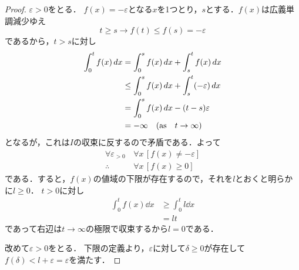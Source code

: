 \begin{enumerate}[(1)]
\begin{enumerate}[(i)]
\begin{proof}
            $\varepsilon > 0$をとる．
            $f(x)= -\varepsilon$となる$x$を1つとり，$s$とする．$f(x)$は広義単調減少ゆえ
            \begin{equation}
                t \ge s \to f(t)\le f(s) = -\varepsilon
            \end{equation}
            であるから，$t>s$に対し
            \begin{align}
                \int^t_0 f(x) \dd{x} 
                &= \int^s_0 f(x) \dd{x} + \int^t_s f(x) \dd{x} \\ 
                &\le \int^s_0 f(x) \dd{x} + \int^t_s (-\varepsilon)\dd{x} \\ 
                &= \int^s_0 f(x) \dd{x} -(t-s)\varepsilon \\ 
                &= -\infty\quad (\qq*{as} t\to \infty)
            \end{align}
            となるが，これは$I$の収束に反するので矛盾である．よって
            \begin{align}
                \forall \varepsilon _{> 0}\, &\forall x\, [f(x) \ne -\varepsilon]\\
                \therefore &\forall x\, [f(x) \ge 0] \label{eq:fx_ge_0}
            \end{align}
            である．すると，$f(x)$の値域の下限が存在するので，それを$l$とおくと明らかに$l\ge 0$．
            $t>0$に対し
            \begin{align}
                \int^t_0 f(x) \dd{x} 
                &\ge \int^t_0 l \dd{x} \\
                &= lt
            \end{align}
            であって右辺は$t\to\infty$の極限で収束するから$l=0$である．

            改めて$\varepsilon > 0$をとる．
            下限の定義より，$\varepsilon$に対して$\delta\ge 0$が存在して$f(\delta)<l+\varepsilon=\varepsilon$を満たす．


\end{proof}
\end{enumerate}
\end{enumerate}
